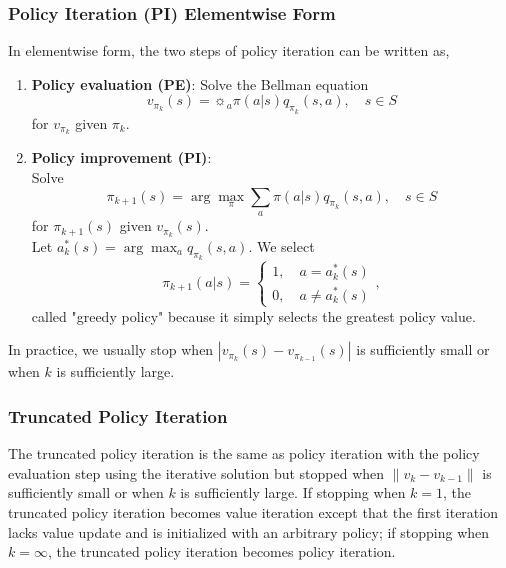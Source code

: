 \documentclass[a4paper,12pt]{report}
\begin{document}
\subsubsection{Policy Iteration (PI) Elementwise Form}
In elementwise form, the two steps of policy iteration can be written as,
\begin{enumerate}
\item \textbf{Policy evaluation (PE)}: Solve the Bellman equation
\[v_{\pi_k}(s)=\sun_a\pi(a|s)q_{\pi_k}(s,a),\quad s\in S\]
for $v_{\pi_k}$ given $\pi_k$.
\item \textbf{Policy improvement (PI)}:\\
Solve
\[\pi_{k+1}(s)=\arg\max_{\pi}\sum_a\pi(a|s)q_{\pi_k}(s,a),\quad s\in S\]
for $\pi_{k+1}(s)$ given $v_{\pi_k}(s)$.\\
Let $a^*_k(s)=\arg\max_aq_{\pi_k}(s,a)$. We select
\[\pi_{k+1}(a|s)=\begin{cases}1,\quad a=a^*_k(s)\\0,\quad a\neq a^*_k(s)\end{cases},\]
called "greedy policy" because it simply selects the greatest policy value.
\end{enumerate}
In practice, we usually stop when $|v_{\pi_k}(s)-v_{\pi_{k-1}}(s)|$ is sufficiently small or when $k$ is sufficiently large.
\subsubsection{Truncated Policy Iteration}
The truncated policy iteration is the same as policy iteration with the policy evaluation step using the iterative solution but stopped when $\|v_k-v_{k-1}\|$ is sufficiently small or when $k$ is sufficiently large. If stopping when $k=1$, the truncated policy iteration becomes value iteration except that the first iteration lacks value update and is initialized with an arbitrary policy; if stopping when $k=\infty$, the truncated policy iteration becomes policy iteration.
\end{document}
